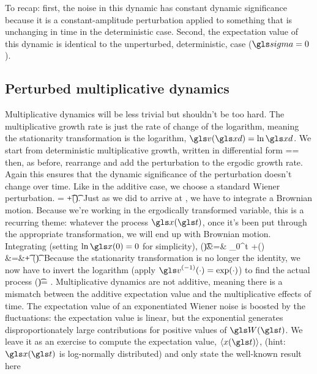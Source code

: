 To recap: first, the noise in this dynamic has constant dynamic significance because it is a constant-amplitude perturbation applied to 
something that is unchanging in time in the deterministic case. Second, the expectation value of this dynamic is identical to 
the unperturbed, deterministic, case ($\gsigma=0$).

\subsection{Perturbed multiplicative dynamics} 
Multiplicative dynamics will be less trivial but shouldn't be too hard. 
The multiplicative growth rate is just the rate of change of the logarithm, meaning the stationarity transformation is the logarithm, $\gv(\xd)=\ln \xd$.
We start from deterministic multiplicative growth, written in differential form
\be
\gexp=\frac{\gd\ln \xd}{\gd\t}=\ggamma
{}
\ee
then, as before, rearrange and add the perturbation to the ergodic growth rate. Again this 
ensures that the dynamic significance of the perturbation doesn't change over time.
Like in the additive case, we choose a standard Wiener perturbation.
\bea
\gd \ln \x= \ggamma  \gd\t +\gsigma \gd \gW(\t).
\eea
Just as we did to arrive at , we have to integrate a Brownian motion. Because we're 
working in the ergodically transformed variable, this is a recurring theme: whatever the process 
$\x(\t)$, once it's been put through the appropriate transformation, we will end up with Brownian 
motion. Integrating  (setting $\ln \x(0)=0$ for simplicity),
\bea
\ln \x(\t)&=& \int_0^t \ggamma  \gd\gs +\gsigma \gd \gW(\gs)\\
&=&\ggamma \t + \gsigma \gW(\t).
\eea
Because the stationarity transformation is no longer the identity, we now have to invert the 
logarithm (apply $\gv^{(-1)}(\cdot)=\exp(\cdot)$) to find the actual process
\bea
\x(\t)= \exp\left[\ggamma \t + \gsigma \gW(\t)\right].
\eea
Multiplicative dynamics are not additive, meaning there is a mismatch between the additive 
expectation value and the multiplicative effects of time. The expectation value of an 
exponentiated Wiener noise is boosted by the fluctuations: the expectation value is linear, 
but the exponential generates disproportionately large contributions for positive values of 
$\gW(\t)$. We leave it as an exercise to compute the expectation value, $\ave{x(\t)}$, 
(hint: $\x(\t)$ is log-normally distributed) and only state the well-known result here
\bea

